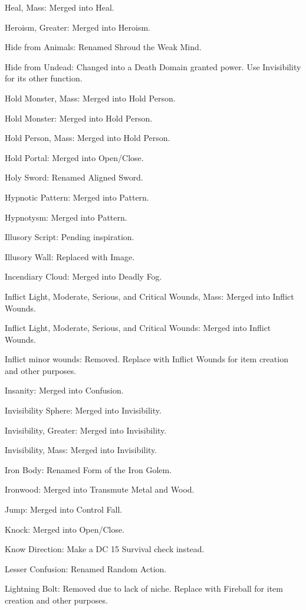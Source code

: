 {\begin{list}{}{\leftmargin=1em}
 \item Heal, Mass: Merged into Heal.
 \item Heroism, Greater: Merged into Heroism.
 \item Hide from Animals: Renamed Shroud the Weak Mind.
 \item Hide from Undead: Changed into a Death Domain granted power. Use Invisibility for its other function.
 \item Hold Monster, Mass: Merged into Hold Person.
 \item Hold Monster: Merged into Hold Person.
 \item Hold Person, Mass: Merged into Hold Person.
 \item Hold Portal: Merged into Open/Close.
 \item Holy Sword: Renamed Aligned Sword.
 \item Hypnotic Pattern: Merged into Pattern.
 \item Hypnotysm: Merged into Pattern.
 \item Illusory Script: Pending inspiration.
 \item Illusory Wall: Replaced with Image. 
 \item Incendiary Cloud: Merged into Deadly Fog.
 \item Inflict Light, Moderate, Serious, and Critical Wounds, Mass: Merged into Inflict Wounds.
 \item Inflict Light, Moderate, Serious, and Critical Wounds: Merged into Inflict Wounds.
 \item Inflict minor wounds: Removed. Replace with Inflict Wounds for item creation and other purposes.
 \item Insanity: Merged into Confusion.
 \item Invisibility Sphere: Merged into Invisibility.
 \item Invisibility, Greater: Merged into Invisibility.
 \item Invisibility, Mass: Merged into Invisibility.
 \item Iron Body: Renamed Form of the Iron Golem.
 \item Ironwood: Merged into Transmute Metal and Wood.
 \item Jump: Merged into Control Fall.
 \item Knock: Merged into Open/Close.
 \item Know Direction: Make a DC 15 Survival check instead.
 \item Lesser Confusion: Renamed Random Action.
 \item Lightning Bolt: Removed due to lack of niche. Replace with Fireball for item creation and other purposes.

\end{list}}
